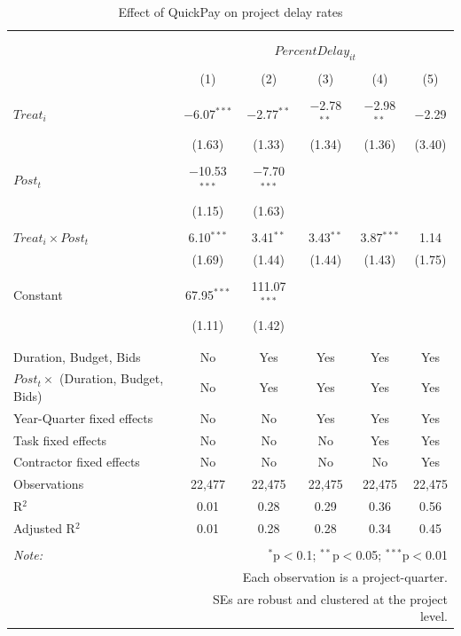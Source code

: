 \documentclass[
]{article}
\begin{document}
\begin{table}[H] \centering 
  \caption{Effect of QuickPay on project delay rates} 
  \label{} 
\small 
\begin{tabular}{@{\extracolsep{-2pt}}lccccc} 
\\[-1.8ex]\hline 
\hline \\[-1.8ex] 
\\[-1.8ex] & \multicolumn{5}{c}{$PercentDelay_{it}$} \\ 
\\[-1.8ex] & (1) & (2) & (3) & (4) & (5)\\ 
\hline \\[-1.8ex] 
 $Treat_i$ & $-$6.07$^{***}$ & $-$2.77$^{**}$ & $-$2.78$^{**}$ & $-$2.98$^{**}$ & $-$2.29 \\ 
  & (1.63) & (1.33) & (1.34) & (1.36) & (3.40) \\ 
  & & & & & \\ 
 $Post_t$ & $-$10.53$^{***}$ & $-$7.70$^{***}$ &  &  &  \\ 
  & (1.15) & (1.63) &  &  &  \\ 
  & & & & & \\ 
 $Treat_i \times Post_t$ & 6.10$^{***}$ & 3.41$^{**}$ & 3.43$^{**}$ & 3.87$^{***}$ & 1.14 \\ 
  & (1.69) & (1.44) & (1.44) & (1.43) & (1.75) \\ 
  & & & & & \\ 
 Constant & 67.95$^{***}$ & 111.07$^{***}$ &  &  &  \\ 
  & (1.11) & (1.42) &  &  &  \\ 
  & & & & & \\ 
\hline \\[-1.8ex] 
Duration, Budget, Bids & No & Yes & Yes & Yes & Yes \\ 
$Post_t \times$  (Duration, Budget, Bids) & No & Yes & Yes & Yes & Yes \\ 
Year-Quarter fixed effects & No & No & Yes & Yes & Yes \\ 
Task fixed effects & No & No & No & Yes & Yes \\ 
Contractor fixed effects & No & No & No & No & Yes \\ 
Observations & 22,477 & 22,475 & 22,475 & 22,475 & 22,475 \\ 
R$^{2}$ & 0.01 & 0.28 & 0.29 & 0.36 & 0.56 \\ 
Adjusted R$^{2}$ & 0.01 & 0.28 & 0.28 & 0.34 & 0.45 \\ 
\hline 
\hline \\[-1.8ex] 
\textit{Note:}  & \multicolumn{5}{r}{$^{*}$p$<$0.1; $^{**}$p$<$0.05; $^{***}$p$<$0.01} \\ 
 & \multicolumn{5}{r}{Each observation is a project-quarter.} \\ 
 & \multicolumn{5}{r}{SEs are robust and clustered at the project level.} \\ 
\end{tabular} 
\end{table}
\end{document}
